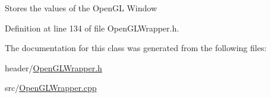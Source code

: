 Stores the values of the Open\+GL Window 

Definition at line 134 of file Open\+G\+L\+Wrapper.\+h.



The documentation for this class was generated from the following files\+:\begin{DoxyCompactItemize}
\item 
header/\mbox{\hyperlink{OpenGLWrapper_8h}{Open\+G\+L\+Wrapper.\+h}}\item 
src/\mbox{\hyperlink{OpenGLWrapper_8cpp}{Open\+G\+L\+Wrapper.\+cpp}}\end{DoxyCompactItemize}

